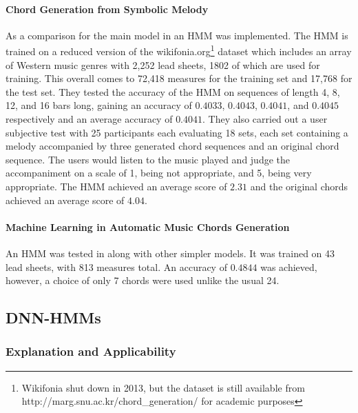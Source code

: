 \paragraph{Chord Generation from Symbolic Melody}  As a comparison for the main model in \cite{BLSTM} an HMM was implemented. 
The HMM is trained on a reduced version of the 
wikifonia.org\footnote{Wikifonia shut down in 2013, but the dataset is still available from http://marg.snu.ac.kr/chord\_generation/ for academic purposes} dataset which includes an array of Western music genres with 2,252 lead sheets, 1802 of which are used for training. 
This overall comes to 72,418 measures for the training set and 17,768 for the test set. 
They tested the accuracy of the HMM on sequences of length 4, 8, 12, and 16 bars long, gaining an accuracy of $0.4033$, $0.4043$, $0.4041$, and $0.4045$ respectively and an average accuracy of $0.4041$.
They also carried out a user subjective test with 25 participants each evaluating 18 sets, each set containing a melody accompanied by three generated chord sequences and an original chord sequence.
The users would listen to the music played and judge the accompaniment on a scale of 1, being not appropriate, and 5, being very appropriate.
The HMM achieved an average score of $2.31$ and the original chords achieved an average score of $4.04$.

\paragraph{Machine Learning in Automatic Music Chords Generation} An HMM was tested in \cite{MLForChords} along with other simpler models. It was trained on 43 lead sheets, with 813 measures total. 
An accuracy of $0.4844$ was achieved, however, a choice of only 7 chords were used unlike the usual 24.


\subsection{DNN-HMMs}

\label{subsec:DNN-HMMs}
\subsubsection{Explanation and Applicability} 

